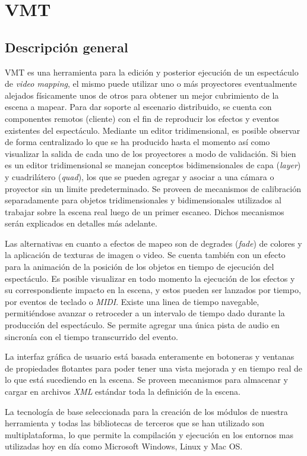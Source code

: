 \chapter{VMT}
\section{Descripción general}
VMT es una herramienta para la edición y posterior ejecución de un espectáculo de \emph{video mapping}, el mismo puede utilizar uno o más proyectores eventualmente alejados físicamente unos de otros para obtener un mejor cubrimiento de la escena a mapear. Para dar soporte al escenario distribuido, se cuenta con componentes remotos (cliente) con el fin de reproducir los efectos y eventos existentes del espectáculo. Mediante un editor tridimensional, es posible observar de forma centralizado lo que se ha producido hasta el momento así como visualizar la salida de cada uno de los proyectores a modo de validación. Si bien es un editor tridimensional se manejan conceptos bidimensionales de capa (\emph{layer}) y cuadrilátero (\emph{quad}), los que se pueden agregar y asociar a una cámara o proyector sin un limite predeterminado. Se proveen de mecanismos de calibración separadamente para objetos tridimensionales y bidimensionales utilizados al trabajar sobre la escena real luego de un primer escaneo. Dichos mecanismos serán explicados en detalles más adelante.

Las alternativas en cuanto a efectos de mapeo son de degrades (\emph{fade}) de colores y la aplicación de texturas de imagen o video. Se cuenta también con un efecto para la animación de la posición de los objetos en tiempo de ejecución del espectáculo. Es posible visualizar en todo momento la ejecución de los efectos y su correspondiente impacto en la escena, y estos pueden ser lanzados por tiempo, por eventos de teclado o \emph{MIDI}. Existe una linea de tiempo navegable, permitiéndose avanzar o retroceder a un intervalo de tiempo dado durante la producción del espectáculo. Se permite agregar una única pista de audio en sincronía con el tiempo transcurrido del evento.

La interfaz gráfica de usuario está basada enteramente en botoneras y ventanas de propiedades flotantes para poder tener una vista mejorada y en tiempo real de lo que está sucediendo en la escena. Se proveen mecanismos para almacenar y cargar en archivos \emph{XML} estándar toda la definición de la escena.

La tecnología de base seleccionada para la creación de los módulos de nuestra herramienta y todas las bibliotecas de terceros que se han utilizado son multiplataforma, lo que permite la compilación y ejecución en los entornos mas utilizadas hoy en día como Microsoft Windows, Linux y Mac OS.

